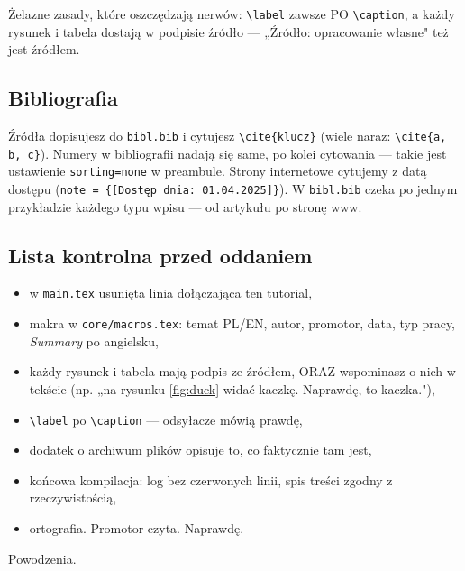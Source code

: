 Żelazne zasady, które oszczędzają nerwów: \verb|\label| zawsze PO
\verb|\caption|, a każdy
rysunek i tabela dostają w podpisie źródło — „Źródło: opracowanie własne"
też jest źródłem.

\subsection*{Bibliografia}

Źródła dopisujesz do \verb|bibl.bib| i cytujesz \verb|\cite{klucz}| (wiele
naraz: \verb|\cite{a, b, c}|). Numery w bibliografii nadają się same, po
kolei cytowania — takie jest ustawienie \verb|sorting=none| w preambule.
Strony internetowe cytujemy z datą dostępu
(\verb|note = {[Dostęp dnia: 01.04.2025]}|). W \verb|bibl.bib| czeka po
jednym przykładzie każdego typu wpisu — od artykułu po stronę www.

\subsection*{Lista kontrolna przed oddaniem}

\begin{itemize}
	\item w \verb|main.tex| usunięta linia dołączająca ten tutorial,
	\item makra w \verb|core/macros.tex|: temat PL/EN, autor, promotor,
	      data, typ pracy, \textit{Summary} po angielsku,
	\item każdy rysunek i tabela mają podpis ze źródłem, ORAZ wspominasz
	      o nich w tekście (np. „na rysunku \ref{fig:duck} widać kaczkę. Naprawdę, to kaczka."),
	\item \verb|\label| po \verb|\caption| — odsyłacze mówią prawdę,
	\item dodatek o archiwum plików opisuje to, co faktycznie tam jest,
	\item końcowa kompilacja: log bez czerwonych linii, spis treści zgodny
	      z rzeczywistością,
	\item ortografia. Promotor czyta. Naprawdę.
\end{itemize}

Powodzenia.

